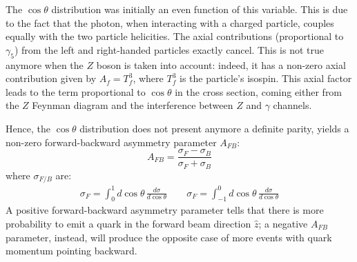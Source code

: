 \documentclass[]{article}
\begin{document}
The $\cos \theta$ distribution was initially an even function of this variable.
This is due to the fact that the photon, when interacting with a charged particle,
couples equally with the two particle helicities. The axial contributions
(proportional to $\gamma_5$) from the left and right-handed particles exactly cancel.
This is not true anymore when the $Z$ boson is taken into account: indeed, it has
a non-zero axial contribution given by $A_f=T^3_f$, where $T_f^3$ is the particle's isospin.
This axial factor leads to the term proportional to $\cos \theta$ in the cross
section, coming either from the $Z$ Feynman diagram and the interference between
$Z$ and $\gamma$ channels.

Hence, the $\cos \theta$ distribution does not present anymore a definite parity,
yields a non-zero forward-backward asymmetry parameter $A_{FB}$:
\begin{equation}
	A_{FB} = \frac{\sigma_F-\sigma_B}{\sigma_F + \sigma_B}
\end{equation}
where $\sigma_{F/B}$ are:
\begin{align*}
	\sigma_F = \int_0^1 d\cos\theta \,\frac{d\sigma}{d\cos\theta} \qquad \sigma_F = \int_{-1}^0 d\cos\theta \, \frac{d\sigma}{d\cos\theta}
\end{align*}
A positive forward-backward asymmetry parameter tells that there is more
probability to emit a quark in the forward beam direction $\hat{z}$; a negative
$A_{FB}$ parameter, instead, will produce the opposite case of more events with
quark momentum pointing backward.
\end{document}

